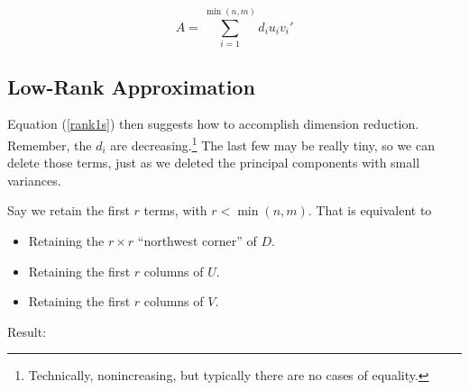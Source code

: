 \begin{equation}
\label{rank1s}
A = \sum_{i=1}^{\min(n,m)} d_i  u_i v_i'
\end{equation}

% 

\subsection{Low-Rank Approximation}

Equation (\ref{rank1s}) then suggests how to accomplish dimension
reduction.  Remember, the $d_i$ are decreasing.\footnote{Technically,
nonincreasing, but typically there are no cases of equality.}  The last
few may be really tiny, so we can delete those terms, just as we
deleted the principal components with small variances.

Say we retain the first $r$ terms, with $r < \min(n,m)$.  That is
equivalent to

\begin{itemize}

\item Retaining the $r \times r$ ``northwest corner'' of $D$.

\item Retaining the first $r$ columns of $U$.

\item Retaining the first $r$ columns of $V$.

\end{itemize} 

Result:


